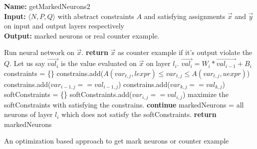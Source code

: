 \begin{algorithm}[t]
  \textbf{Name: } getMarkedNeurons2 \\
  \textbf{Input: } $\langle N,P,Q \rangle$ with abstract constraints $A$ and satisfying assignments $\overrightarrow{x}$ and $\overrightarrow{y}$ on input and output layers respectively\\
  \textbf{Output: } marked neurons or real counter example. 
  \begin{algorithmic}[1]
    \State Run neural network on $\overrightarrow{x}$.
    \State \textbf{return} $\overrightarrow{x}$ as counter example if it's output violate the $Q$. 
    \State Let us say $\overrightarrow{val_{i}}$ is the value evaluated on $\overrightarrow{x}$ on layer $l_i$. 
     
        \State $\overrightarrow{val_i} = W_i * \overrightarrow{val_{i-1}} + B_i$ 
      \Else
        \State constraints = \{\}
            \State constrains.add($A(var_{t,j},lexpr) \leq var_{t,j}\leq A(var_{t,j},uexpr)$)
          \EndFor
        \EndFor
          \State constrains.add($var_{i-1,j} == val_{i-1,j}$)
        \EndFor
          \State constrains.add($var_{k,j} == val_{k,j}$)
        \EndFor
        softConstraints = \{\}
          \State softConstraints.add($var_{i,j} == val_{i,j}$)
        \EndFor
        \State maximize the softConstraints with satisfying the constrains. 
          \State \textbf{continue}
        \Else
          \State markedNeurons = all neurons of layer $l_i$ which does not satisfy the softConstraints. 
          \State \textbf{return} markedNeurons
        \EndIf 
      \EndIf
    \EndFor
  \end{algorithmic}
  \caption{An optimization based approach to get mark neurons or counter example}
  \label{algo:refine2}
\end{algorithm}







